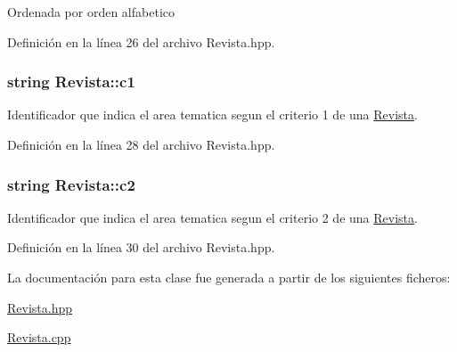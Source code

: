 Ordenada por orden alfabetico 

Definición en la línea 26 del archivo Revista.\-hpp.

\hypertarget{class_revista_ae4142bc39207ffc39691c5a88d0c9162}{
\subsubsection[{c1}]{\setlength{\rightskip}{0pt plus 5cm}string Revista\-::c1\hspace{0.3cm}{\ttfamily [private]}}}\label{class_revista_ae4142bc39207ffc39691c5a88d0c9162}


Identificador que indica el area tematica segun el criterio 1 de una \hyperlink{class_revista}{Revista}. 



Definición en la línea 28 del archivo Revista.\-hpp.

\hypertarget{class_revista_a55e1411b360476402d364c0b956d7fc6}{
\subsubsection[{c2}]{\setlength{\rightskip}{0pt plus 5cm}string Revista\-::c2\hspace{0.3cm}{\ttfamily [private]}}}\label{class_revista_a55e1411b360476402d364c0b956d7fc6}


Identificador que indica el area tematica segun el criterio 2 de una \hyperlink{class_revista}{Revista}. 



Definición en la línea 30 del archivo Revista.\-hpp.



La documentación para esta clase fue generada a partir de los siguientes ficheros\-:\begin{DoxyCompactItemize}
\item 
\hyperlink{_revista_8hpp}{Revista.\-hpp}\item 
\hyperlink{_revista_8cpp}{Revista.\-cpp}\end{DoxyCompactItemize}
